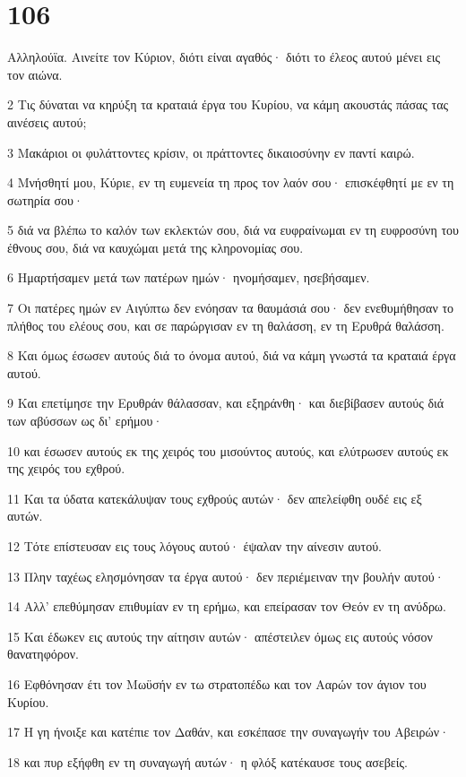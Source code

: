 \chapter{106}

\par Αλληλούϊα. Αινείτε τον Κύριον, διότι είναι αγαθός· διότι το έλεος αυτού μένει εις τον αιώνα.
\par 2 Τις δύναται να κηρύξη τα κραταιά έργα του Κυρίου, να κάμη ακουστάς πάσας τας αινέσεις αυτού;
\par 3 Μακάριοι οι φυλάττοντες κρίσιν, οι πράττοντες δικαιοσύνην εν παντί καιρώ.
\par 4 Μνήσθητί μου, Κύριε, εν τη ευμενεία τη προς τον λαόν σου· επισκέφθητί με εν τη σωτηρία σου·
\par 5 διά να βλέπω το καλόν των εκλεκτών σου, διά να ευφραίνωμαι εν τη ευφροσύνη του έθνους σου, διά να καυχώμαι μετά της κληρονομίας σου.
\par 6 Ημαρτήσαμεν μετά των πατέρων ημών· ηνομήσαμεν, ησεβήσαμεν.
\par 7 Οι πατέρες ημών εν Αιγύπτω δεν ενόησαν τα θαυμάσιά σου· δεν ενεθυμήθησαν το πλήθος του ελέους σου, και σε παρώργισαν εν τη θαλάσση, εν τη Ερυθρά θαλάσση.
\par 8 Και όμως έσωσεν αυτούς διά το όνομα αυτού, διά να κάμη γνωστά τα κραταιά έργα αυτού.
\par 9 Και επετίμησε την Ερυθράν θάλασσαν, και εξηράνθη· και διεβίβασεν αυτούς διά των αβύσσων ως δι' ερήμου·
\par 10 και έσωσεν αυτούς εκ της χειρός του μισούντος αυτούς, και ελύτρωσεν αυτούς εκ της χειρός του εχθρού.
\par 11 Και τα ύδατα κατεκάλυψαν τους εχθρούς αυτών· δεν απελείφθη ουδέ εις εξ αυτών.
\par 12 Τότε επίστευσαν εις τους λόγους αυτού· έψαλαν την αίνεσιν αυτού.
\par 13 Πλην ταχέως ελησμόνησαν τα έργα αυτού· δεν περιέμειναν την βουλήν αυτού·
\par 14 Αλλ' επεθύμησαν επιθυμίαν εν τη ερήμω, και επείρασαν τον Θεόν εν τη ανύδρω.
\par 15 Και έδωκεν εις αυτούς την αίτησιν αυτών· απέστειλεν όμως εις αυτούς νόσον θανατηφόρον.
\par 16 Εφθόνησαν έτι τον Μωϋσήν εν τω στρατοπέδω και τον Ααρών τον άγιον του Κυρίου.
\par 17 Η γη ήνοιξε και κατέπιε τον Δαθάν, και εσκέπασε την συναγωγήν του Αβειρών·
\par 18 και πυρ εξήφθη εν τη συναγωγή αυτών· η φλόξ κατέκαυσε τους ασεβείς.
